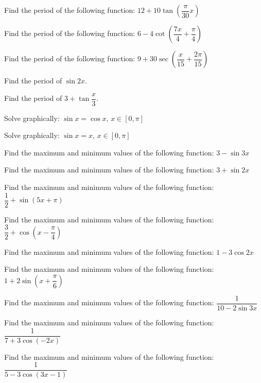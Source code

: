 \documentclass[11pt,a4paper]{article}
\begin{document}
\begin{shortlist}
\item Find the period of the following function: $12+10\tan\left(\dfrac{\pi}{30}x\right)$

\item Find the period of the following function: $6-4\cot\left(\dfrac{7x}{4}+\dfrac{\pi}{4}\right)$

\item Find the period of the following function: $9+30\sec\left(\dfrac{x}{15}+\dfrac{2\pi}{15}\right)$

\item Find the period of $\sin2x$.

\item Find the period of $3+\tan\dfrac{x}{3}$.

\item Solve graphically: $\sin x=\cos x$, $x\in[0,\pi]$

\item Solve graphically: $\sin x=x$, $x\in[0,\pi]$

\item Find the maximum and minimum values of the following function: $3-\sin3x$

\item Find the maximum and minimum values of the following function: $3+\sin2x$

\item Find the maximum and minimum values of the following function: $\dfrac{1}{2}+\sin(5x+\pi)$

\item Find the maximum and minimum values of the following function: $\dfrac{3}{2}+\cos\left(x-\dfrac{\pi}{4}\right)$

\item Find the maximum and minimum values of the following function: $1-3\cos2x$

\item Find the maximum and minimum values of the following function: $1+2\sin\left(x+\dfrac{\pi}{6}\right)$

\item Find the maximum and minimum values of the following function: $\dfrac{1}{10-2\sin3x}$

\item Find the maximum and minimum values of the following function: $\dfrac{1}{7+3\cos(-2x)}$

\item Find the maximum and minimum values of the following function: $\dfrac{1}{5-3\cos(3x-1)}$


\end{shortlist}
\end{document}
